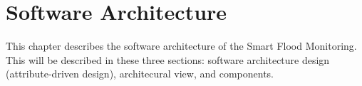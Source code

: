 \chapter{Software Architecture}
\label{ch:software}
This chapter describes the software architecture of the Smart Flood Monitoring. This will be described in these three sections: software architecture design (attribute-driven design), architecural view, and components.





